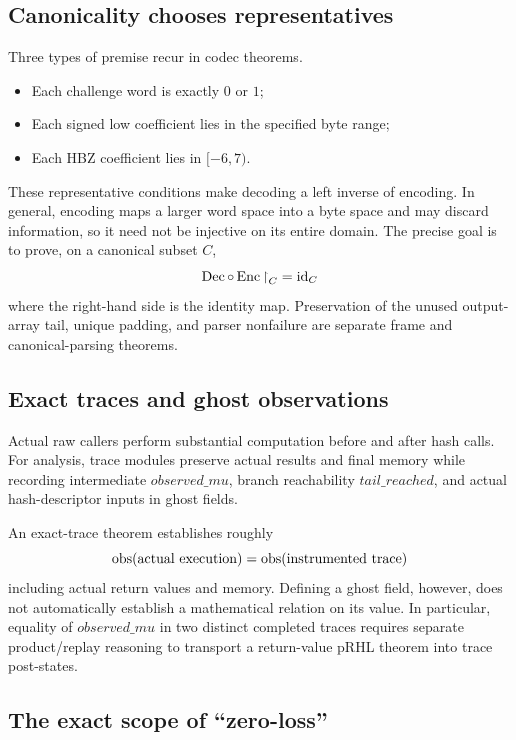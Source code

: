 \subsection{Canonicality chooses representatives}

Three types of premise recur in codec theorems.

\begin{itemize}
  \item Each challenge word is exactly \(0\) or \(1\);
  \item Each signed low coefficient lies in the specified byte range;
  \item Each HBZ coefficient lies in \([-6,7)\).
\end{itemize}

These representative conditions make decoding a left inverse of encoding.
In general, encoding maps a larger word space into a byte space and may discard
information, so it need not be injective on its entire domain.
The precise goal is to prove, on a canonical subset \(C\),
\[
  \mathop{\mathrm{Dec}}\circ\mathop{\mathrm{Enc}}\mathord{\upharpoonright}_C=\operatorname{id}_C
\]
where the right-hand side is the identity map.
Preservation of the unused output-array tail, unique padding, and parser
nonfailure are separate frame and canonical-parsing theorems.

\subsection{Exact traces and ghost observations}

Actual raw callers perform substantial computation before and after hash calls.
For analysis, trace modules preserve actual results and final memory while
recording intermediate \(\mathit{observed\_mu}\), branch reachability
\(\mathit{tail\_reached}\), and actual hash-descriptor inputs in ghost fields.

An exact-trace theorem establishes roughly
\[
  \mathop{\mathrm{obs}}(\text{actual execution})=
  \mathop{\mathrm{obs}}(\text{instrumented trace})
\]
including actual return values and memory.
Defining a ghost field, however, does not automatically establish a mathematical
relation on its value. In particular, equality of
\(\mathit{observed\_mu}\) in two distinct completed traces requires separate
product/replay reasoning to transport a return-value pRHL theorem into trace
post-states.

\subsection{The exact scope of “zero-loss”}

